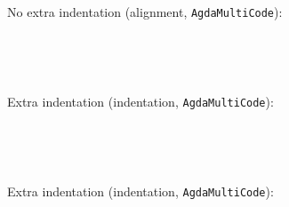 \documentclass{article}
\begin{document}
\noindent No extra indentation (alignment, \texttt{AgdaMultiCode}):
\begin{AgdaMultiCode}
\begin{code}[hide]%
%
\>[2]\<%
\\
\>[2][@{}l@{\AgdaIndent{0}}]%
\>[4]\AgdaPostulate{\AgdaUnderscore{}}%
\>[24I]\AgdaSymbol{:}\<%
\end{code}
\begin{code}%
\>[.][@{}l@{}]\<[24I]%
\>[6]\<%
\end{code}
\begin{code}[hide]%
%
\>[2]\<%
\\
\>[2][@{}l@{\AgdaIndent{0}}]%
\>[4]\AgdaPostulate{\AgdaUnderscore{}}%
\>[25I]\AgdaSymbol{:}\<%
\end{code}
\begin{code}%
\>[.][@{}l@{}]\<[25I]%
\>[6]\<%
\end{code}
\end{AgdaMultiCode}

\noindent Extra indentation (indentation, \texttt{AgdaMultiCode}):
\begin{AgdaMultiCode}
\begin{code}[hide]%
%
\>[2]\<%
\\
\>[2][@{}l@{\AgdaIndent{0}}]%
\>[4]\AgdaPostulate{\AgdaUnderscore{}}%
\>[26I]\AgdaSymbol{:}\<%
\end{code}
\begin{code}%
\>[26I][@{}l@{\AgdaIndent{1}}]%
\>[7]\<%
\end{code}
\begin{code}[hide]%
%
\>[2]\<%
\\
\>[2][@{}l@{\AgdaIndent{0}}]%
\>[4]\AgdaPostulate{\AgdaUnderscore{}}%
\>[27I]\AgdaSymbol{:}\<%
\end{code}
\begin{code}%
\>[27I][@{}l@{\AgdaIndent{1}}]%
\>[7]\<%
\end{code}
\end{AgdaMultiCode}

\noindent Extra indentation (indentation, \texttt{AgdaMultiCode}):
\begin{AgdaMultiCode}
\begin{code}[hide]%
%
\>[2]\<%
\\
\>[2][@{}l@{\AgdaIndent{0}}]%
\>[4]\AgdaSpace{}%
\AgdaSymbol{:}\<%
\end{code}
\begin{code}%
\>[4][@{}l@{\AgdaIndent{1}}]%
\>[6]\<%
\end{code}
\begin{code}[hide]%
%
\>[2]\<%
\\
\>[2][@{}l@{\AgdaIndent{0}}]%
\>[4]\AgdaSpace{}%
\AgdaSymbol{:}\<%
\end{code}
\begin{code}%
\>[4][@{}l@{\AgdaIndent{1}}]%
\>[6]\<%
\end{code}
\end{AgdaMultiCode}
\end{document}
